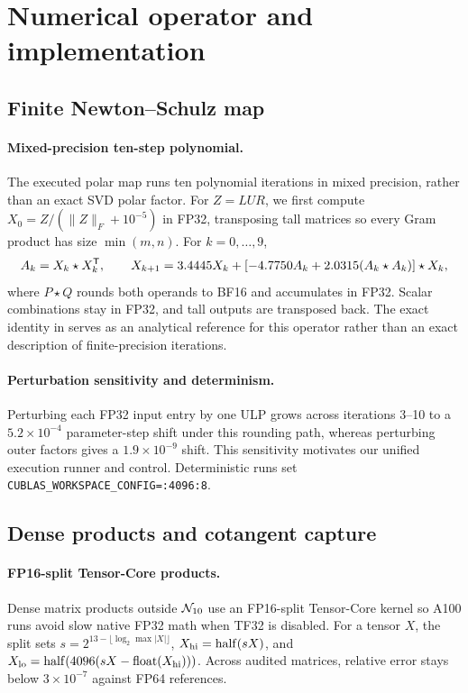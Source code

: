 \section{Numerical operator and implementation}
\label{app:appendix_math}

\subsection{Finite Newton--Schulz map}

\paragraph{Mixed-precision ten-step polynomial.}
The executed polar map runs ten polynomial iterations in mixed precision, rather than an exact SVD polar factor. For $Z=LUR$, we first compute $X_0=Z/(\|Z\|_F+10^{-5})$ in FP32, transposing tall matrices so every Gram product has size $\min(m,n)$. For $k=0,\ldots,9$,
\begin{equation}
 A_k=X_k\star X_k^{{\mathsf{T}}},\qquad
 X_{k+1}=3.4445X_k+[-4.7750A_k+2.0315(A_k\star A_k)]\star X_k,
 \label{eq:ns10}
\end{equation}
where $P\star Q$ rounds both operands to BF16 and accumulates in FP32. Scalar combinations stay in FP32, and tall outputs are transposed back. The exact identity in  serves as an analytical reference for this operator rather than an exact description of finite-precision iterations.

\paragraph{Perturbation sensitivity and determinism.}
Perturbing each FP32 input entry by one ULP grows across iterations 3--10 to a $5.2\times10^{-4}$ parameter-step shift under this rounding path, whereas perturbing outer factors gives a $1.9\times10^{-9}$ shift. This sensitivity motivates our unified execution runner and  control. Deterministic runs set \texttt{CUBLAS\_WORKSPACE\_CONFIG=:4096:8}.

\subsection{Dense products and cotangent capture}

\paragraph{FP16-split Tensor-Core products.}
Dense matrix products outside $\mathcal{N}_{10}$ use an FP16-split Tensor-Core kernel so A100 runs avoid slow native FP32 math when TF32 is disabled. For a tensor $X$, the split sets $s=2^{13-\lfloor\log_2\max|X|\rfloor}$, $X_{\rm hi}=\operatorname{half}(sX)$, and $X_{\rm lo}=\operatorname{half}(4096(sX-\operatorname{float}(X_{\rm hi})))$. Across audited matrices, relative error stays below $3\times10^{-7}$ against FP64 references.

